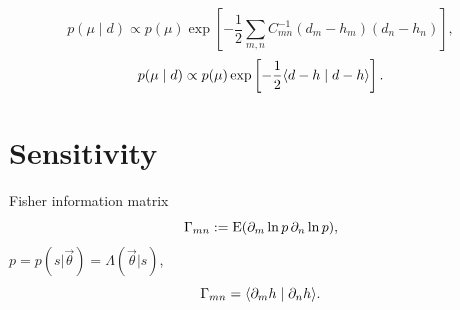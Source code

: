 \begin{equation}
    p(\mu\mid d)\propto p(\mu)\exp\left[-\frac{1}{2}\sum_{m,n}C_{mn}^{-1}(d_m-h_m)(d_n-h_n)\right],
\end{equation}
\begin{equation}
    p(\mu\mid d)\propto p(\mu)\exp\left[-\frac{1}{2}\langle d-h\mid d-h \rangle\right].
\end{equation}

\section{Sensitivity}

Fisher information matrix
\begin{equation}
    \Gamma_{mn}:=\text{E}(\partial_m \ln p\,\partial_n \ln p),
\end{equation}
$p=p(s|\vec{\theta})=\Lambda(\vec{\theta}|s)$,
\begin{equation}
    \Gamma_{mn}=\langle \partial_m h\mid \partial_n h \rangle.
\end{equation}
